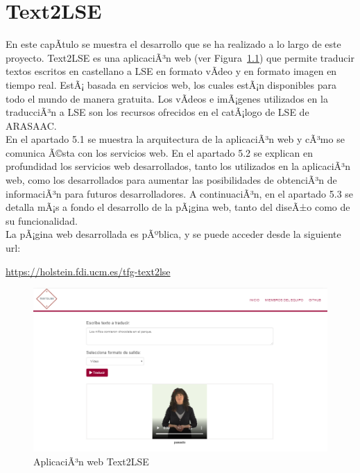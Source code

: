 %
%

\chapter{Text2LSE}


En este capÃ­tulo se muestra el desarrollo que se ha realizado a lo largo de este proyecto. Text2LSE es una aplicaciÃ³n web (ver Figura~\ref {fig: imgWebText2LSE}) que permite traducir textos escritos en castellano a LSE en formato vÃ­deo y en formato imagen en tiempo real. EstÃ¡ basada en servicios web, los cuales estÃ¡n disponibles para todo el mundo de manera gratuita. Los vÃ­deos e imÃ¡genes utilizados en la traducciÃ³n a LSE son los recursos ofrecidos en el catÃ¡logo de LSE de ARASAAC. \\

En el apartado 5.1 se muestra la arquitectura de la aplicaciÃ³n web y cÃ³mo se comunica Ã©sta con los servicios web. En el apartado 5.2 se explican en profundidad los servicios web desarrollados, tanto los utilizados en la aplicaciÃ³n web, como los desarrollados para aumentar las posibilidades de obtenciÃ³n de informaciÃ³n para futuros desarrolladores. A continuaciÃ³n, en el apartado 5.3 se detalla mÃ¡s a fondo el desarrollo de la pÃ¡gina web, tanto del diseÃ±o como de su funcionalidad. \\

La pÃ¡gina web desarrollada es pÃºblica, y se puede acceder desde la siguiente url:

\begin{shaded}
	\url{https://holstein.fdi.ucm.es/tfg-text2lse }	
\end{shaded}

\begin{figure}[]
	\centering
	\includegraphics[width=1\textwidth]{Imagenes/Fuentes/Text2LSE/WebText2LSE.png}
	\caption{AplicaciÃ³n web Text2LSE }
	\label {fig: imgWebText2LSE}
\end{figure}

